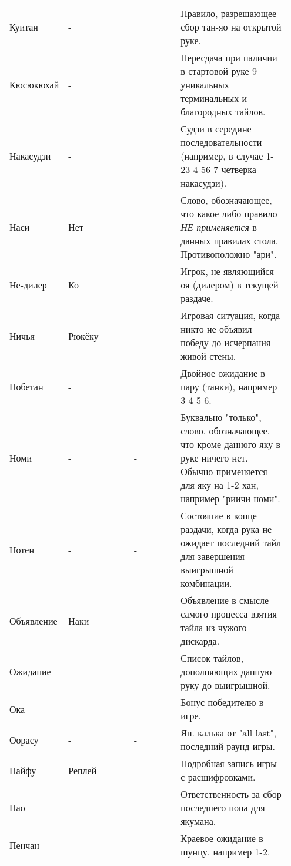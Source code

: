 \begin{tabularx}{\linewidth}{|L{0.14\linewidth}|L{0.13\linewidth}|L{0.1\linewidth}|L{0.18\linewidth}|L{0.4\linewidth}|}
	Куитан & - &  &  & Правило, разрешающее сбор тан-яо на открытой руке. \\
	Кюсюкюхай & - &  &  & Пересдача при наличии в стартовой руке 9 уникальных терминальных и благородных тайлов. \\
	Накасудзи & - &  &  & Судзи в середине последовательности (например, в случае 1-23-4-56-7 четверка - накасудзи). \\
	Наси & Нет &  &  & Слово, обозначающее, что какое-либо правило \textit{НЕ применяется} в данных правилах стола. Противоположно "ари". \\
	Не-дилер & Ко &  &  & Игрок, не являющийся оя (дилером) в текущей раздаче. \\
	Ничья & Рюкёку &  &  & Игровая ситуация, когда никто не объявил победу до исчерпания живой стены. \\
	Нобетан & - &  &  & Двойное ожидание в пару (танки), например 3-4-5-6. \\
	Номи & - &  & - & Буквально "только", слово, обозначающее, что кроме данного яку в руке ничего нет. Обычно применяется для яку на 1-2 хан, например "риичи номи". \\
	Нотен & - &  & - & Состояние в конце раздачи, когда рука не ожидает последний тайл для завершения выигрышной комбинации. \\
	Объявление & Наки &  &  & Объявление в смысле самого процесса взятия тайла из чужого дискарда. \\
	Ожидание & - &  &  & Список тайлов, дополняющих данную руку до выигрышной. \\
	Ока & - &  & - & Бонус победителю в игре. \\
	Оорасу & - &  & - & Яп. калька от "all last", последний раунд игры. \\
	Пайфу & Реплей &  &  & Подробная запись игры с расшифровками. \\
	Пао & - &  &  & Ответственность за сбор последнего пона для якумана. \\
	Пенчан & - &  &  & Краевое ожидание в шунцу, например 1-2. \\

\end{tabularx}
